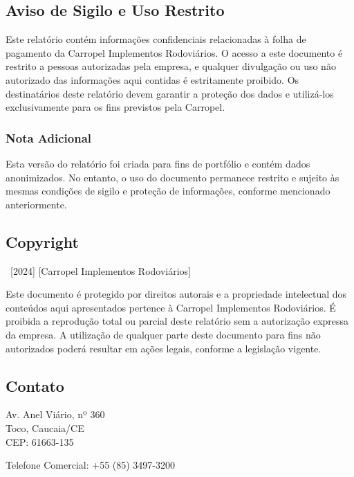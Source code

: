 \documentclass[a4paper, 12pt]{CSSullivanBusinessReport}
\begin{document}
\begin{twothirdswidth} 
	\footnotesize 
	
	\subsection*{Aviso de Sigilo e Uso Restrito}

Este relatório contém informações confidenciais relacionadas à folha de pagamento da Carropel Implementos Rodoviários. O acesso a este documento é restrito a pessoas autorizadas pela empresa, e qualquer divulgação ou uso não autorizado das informações aqui contidas é estritamente proibido. Os destinatários deste relatório devem garantir a proteção dos dados e utilizá-los exclusivamente para os fins previstos pela Carropel.

    \subsubsection*{Nota Adicional}

Esta versão do relatório foi criada para fins de portfólio e contém dados anonimizados. No entanto, o uso do documento permanece restrito e sujeito às mesmas condições de sigilo e proteção de informações, conforme mencionado anteriormente.


	\subsection*{Copyright}
	
	\textcopyright~[2024] [Carropel Implementos Rodoviários] 
	
Este documento é protegido por direitos autorais e a propriedade intelectual dos conteúdos aqui apresentados pertence à Carropel Implementos Rodoviários. É proibida a reprodução total ou parcial deste relatório sem a autorização expressa da empresa. A utilização de qualquer parte deste documento para fins não autorizados poderá resultar em ações legais, conforme a legislação vigente.

	
	\subsection*{Contato}
	
	Av. Anel Viário, nº 360\\
	Toco, Caucaia/CE\\
	CEP: 61663-135

	Telefone Comercial: +55 (85) 3497-3200 
	

\end{twothirdswidth}
\end{document}
